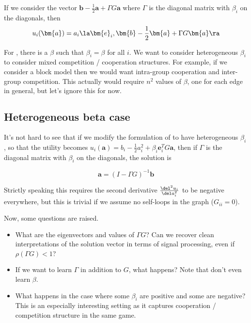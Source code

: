 If we consider the vector $\bm{b} - \frac 1 2 \bm{a} + \Gamma G \bm{a}$ where $\Gamma$ is the diagonal matrix with $\beta_i$ on the diagonals, then 
\[
u_i(\bm{a}) = a_i \la \bm{e}_i, \bm{b} - \frac 1 2 \bm{a} + \Gamma G \bm{a} \ra 
\]

\begin{remark}
For \cite{leng2020learning}, there is a $\beta$ such that $\beta_i = \beta$ for all $i$. We want to consider heterogeneous $\beta_i$ to consider mixed competition / cooperation structures. For example, if we consider a block model then we would want intra-group cooperation and inter-group competition. This actually would require $n^2$ values of $\beta$, one for each edge in general, but let's ignore this for now. 
\end{remark}

\subsection{Heterogeneous beta case}

It's not hard to see that if we modify the formulation of \cite{leng2020learning} to have heterogeneous $\beta_i$, so that the utility becomes $u_i(\bm{a}) = b_i - \frac 1 2 a_i^2 + \beta_i \bm{e}_i^T G \bm{a}$, then if $\Gamma$ is the diagonal matrix with $\beta_i$ on the diagonals, the solution is 

$$\bm{a} = (I - \Gamma G)^{-1} \bm{b}$$

Strictly speaking this requires the second derivative $\frac{\del^2 u_i}{\del a_i^2}$ to be negative everywhere, but this is trivial if we assume no self-loops in the graph ($G_{ii} = 0$). 

Now, some questions are raised. 

\begin{itemize}
    \item What are the eigenvectors and values of $\Gamma G$? Can we recover clean interpretations of the solution vector in terms of signal processing, even if $\rho(\Gamma G) < 1$? 
    \item If we want to learn $\Gamma$ in addition to $G$, what happens? Note that \cite{leng2020learning} don't even learn $\beta$. 
    \item What happens in the case where some $\beta_i$ are positive and some are negative? This is an especially interesting setting as it captures cooperation / competition structure in the same game. 
\end{itemize}

